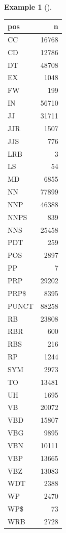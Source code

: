 \documentclass[
  letterpaper,
  DIV=11,
  numbers=noendperiod]{scrreport}
\theoremstyle{definition}
\newtheorem{example}{Example}[chapter]
\theoremstyle{remark}
\begin{document}
\begin{example}[]
\begin{table}
\centering
\begin{tabular}{l|r}
\hline
pos & n\\
\hline
CC & 16768\\
\hline
CD & 12786\\
\hline
DT & 48708\\
\hline
EX & 1048\\
\hline
FW & 199\\
\hline
IN & 56710\\
\hline
JJ & 31711\\
\hline
JJR & 1507\\
\hline
JJS & 776\\
\hline
LRB & 3\\
\hline
LS & 54\\
\hline
MD & 6855\\
\hline
NN & 77899\\
\hline
NNP & 46388\\
\hline
NNPS & 839\\
\hline
NNS & 25458\\
\hline
PDT & 259\\
\hline
POS & 2897\\
\hline
PP & 7\\
\hline
PRP & 29202\\
\hline
PRP\$ & 8395\\
\hline
PUNCT & 88258\\
\hline
RB & 23808\\
\hline
RBR & 600\\
\hline
RBS & 216\\
\hline
RP & 1244\\
\hline
SYM & 2973\\
\hline
TO & 13481\\
\hline
UH & 1695\\
\hline
VB & 20072\\
\hline
VBD & 15807\\
\hline
VBG & 9895\\
\hline
VBN & 10111\\
\hline
VBP & 13665\\
\hline
VBZ & 13083\\
\hline
WDT & 2388\\
\hline
WP & 2470\\
\hline
WP\$ & 73\\
\hline
WRB & 2728\\
\hline
\end{tabular}
\end{table}

\end{example}
\end{document}
